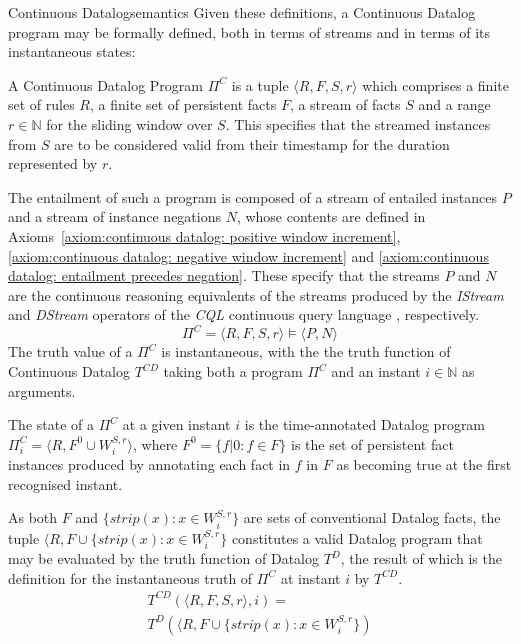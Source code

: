 \begin{nestedsection}{Continuous Datalog}{semantics}
Given these definitions, a Continuous Datalog program may be formally
defined, both in terms of streams and in terms of its instantaneous
states:

\begin{definition}\label{def:continuous datalog: CDP}
A Continuous Datalog Program $\Pi^C$ is a tuple ${\langle R, F, S, r
\rangle}$ which comprises a finite set of rules $R$, a finite set of persistent
facts $F$, a stream of facts $S$ and a range ${r \in \mathbb{N}}$ for
the sliding window over $S$. This specifies that the streamed instances from $S$ are
to be considered valid from their timestamp for the duration represented
by $r$.

The entailment of such a program is composed of a stream of entailed
instances $P$ and a stream of instance negations $N$, whose contents
are defined in 
Axioms~\ref{axiom:continuous datalog: positive window increment}, 
\ref{axiom:continuous datalog: negative window increment} and
\ref{axiom:continuous datalog: entailment precedes negation}. 
These specify that the streams $P$ and $N$ are the continuous
reasoning equivalents of the streams produced by the \emph{IStream}
and \emph{DStream} operators of the \emph{CQL} continuous query
language \citep{CQL}, respectively.
\[ \Pi^C = \langle R, F, S, r \rangle \vDash \langle P, N \rangle \]
The truth value of a $\Pi^C$ is instantaneous, with the the truth
function of Continuous Datalog $T^{CD}$ taking both a program ${\Pi^C}$
and an instant ${i \in \mathbb{N}}$ as arguments.
\end{definition}

\begin{definition}[State of a $\Pi^C$]\label{def:continuous datalog: CDPt}
The state of a $\Pi^C$ at a given instant $i$ is the time-annotated
Datalog program ${\Pi^C_i = \langle R, F^0 \cup W^{S,r}_{i} \rangle}$,
where ${F^0 = \{ f | 0 : f \in F \}}$ is the set of persistent fact instances produced by
annotating each fact in $f$ in $F$ as becoming true at the first recognised instant.

As both $F$ and ${\{ strip(x) : x \in W^{S,r}_{i} \}}$ are sets of conventional
Datalog facts, the tuple ${\langle R, F \cup \{ strip(x) : x \in W^{S,r}_{i} \}}$
constitutes a valid Datalog program that may be evaluated by the truth
function of Datalog $T^{D}$, the result of which is the definition for the
instantaneous truth of $\Pi^C$ at instant $i$ by $T^{CD}$.
\begin{multline*}
T^{CD} \left( \langle R, F, S, r \rangle, i \right) = \\
	T^{D} \left( \langle R, F \cup \{ strip(x) : x \in W^{S,r}_{i} \} \right)
\end{multline*}


\end{definition}
\end{nestedsection}
